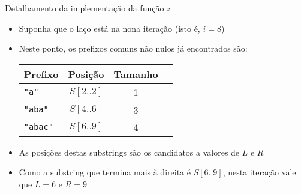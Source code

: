 \begin{frame}[fragile]{Detalhamento da implementação da função $z$}

    \begin{itemize}
        \item Suponha que o laço  está na nona iteração (isto é, $i = 8$)
        \pause

        \item Neste ponto, os prefixos comuns não nulos já encontrados são:

        \vspace{0.1in}
        \begin{center}
            \begin{tabularx}{0.7\textwidth}{Xccc}
            \toprule
            \textbf{Prefixo} & \textbf{Posição} & \textbf{Tamanho} \\
            \midrule
            \textcolor{red!80!black}{\verb|"a"|} & $S[2..2]$ & 1 \\
            \textcolor{red!80!black}{\verb|"aba"|} & $S[4..6]$ & 3 \\
            \textcolor{red!80!black}{\verb|"abac"|} & $S[6..9]$ & 4 \\
            \bottomrule
            \end{tabularx}
        \end{center}
        \vspace{0.1in}
        \pause

        \item As posições destas substrings são os candidatos a valores de $L$ e $R$
        \pause

        \item Como a substring que termina mais à direita é $S[6..9]$, nesta iteração vale que
            $L = 6$ e $R = 9$
    \end{itemize}

\end{frame}

